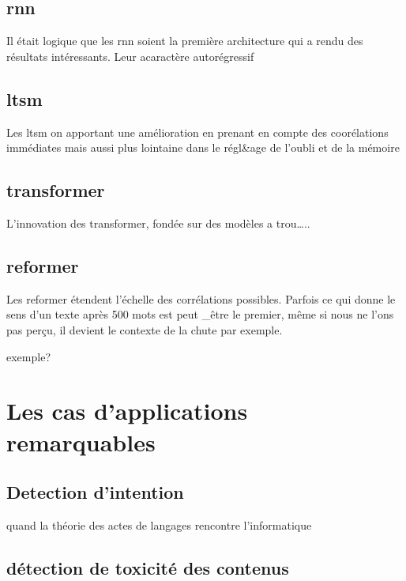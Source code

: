 \documentclass[
]{book}
\begin{document}
\hypertarget{rnn}{%
\subsection{rnn}\label{rnn}}

Il était logique que les rnn soient la première architecture qui a rendu des résultats intéressants. Leur acaractère autorégressif

\hypertarget{ltsm}{%
\subsection{ltsm}\label{ltsm}}

Les ltsm on apportant une amélioration en prenant en compte des coorélations immédiates mais aussi plus lointaine dans le régl\&age de l'oubli et de la mémoire

\hypertarget{transformer}{%
\subsection{transformer}\label{transformer}}

L'innovation des transformer, fondée sur des modèles a trou\ldots..

\hypertarget{reformer}{%
\subsection{reformer}\label{reformer}}

Les reformer étendent l'échelle des corrélations possibles. Parfois ce qui donne le sens d'un texte après 500 mots est peut \_être le premier, même si nous ne l'ons pas perçu, il devient le contexte de la chute par exemple.

exemple?

\hypertarget{les-cas-dapplications-remarquables}{%
\section{Les cas d'applications remarquables}\label{les-cas-dapplications-remarquables}}

\hypertarget{detection-dintention}{%
\subsection{Detection d'intention}\label{detection-dintention}}

quand la théorie des actes de langages rencontre l'informatique

\hypertarget{duxe9tection-de-toxicituxe9-des-contenus}{%
\subsection{détection de toxicité des contenus}\label{duxe9tection-de-toxicituxe9-des-contenus}}
\end{document}
